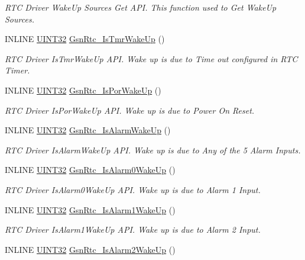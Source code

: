 \begin{DoxyCompactItemize}
\begin{DoxyCompactList}\small\item\em RTC Driver WakeUp Sources Get API. This function used to Get WakeUp Sources. \end{DoxyCompactList}\item 
INLINE \hyperlink{a00660_gae1e6edbbc26d6fbc71a90190d0266018}{UINT32} \hyperlink{a00651_gac5f85e1752f44da34bca2d3166fa9216}{GsnRtc\_\-IsTmrWakeUp} ()
\begin{DoxyCompactList}\small\item\em RTC Driver IsTmrWakeUp API. Wake up is due to Time out configured in RTC Timer. \end{DoxyCompactList}\item 
INLINE \hyperlink{a00660_gae1e6edbbc26d6fbc71a90190d0266018}{UINT32} \hyperlink{a00651_gac8dbdbc4b1c56ab9676f530d5c2a3832}{GsnRtc\_\-IsPorWakeUp} ()
\begin{DoxyCompactList}\small\item\em RTC Driver IsPorWakeUp API. Wake up is due to Power On Reset. \end{DoxyCompactList}\item 
INLINE \hyperlink{a00660_gae1e6edbbc26d6fbc71a90190d0266018}{UINT32} \hyperlink{a00651_gad1ed2ab29251cd12aa6111b17f0e2cd3}{GsnRtc\_\-IsAlarmWakeUp} ()
\begin{DoxyCompactList}\small\item\em RTC Driver IsAlarmWakeUp API. Wake up is due to Any of the 5 Alarm Inputs. \end{DoxyCompactList}\item 
INLINE \hyperlink{a00660_gae1e6edbbc26d6fbc71a90190d0266018}{UINT32} \hyperlink{a00651_ga29ead4066eafd8132311c4930354dda9}{GsnRtc\_\-IsAlarm0WakeUp} ()
\begin{DoxyCompactList}\small\item\em RTC Driver IsAlarm0WakeUp API. Wake up is due to Alarm 1 Input. \end{DoxyCompactList}\item 
INLINE \hyperlink{a00660_gae1e6edbbc26d6fbc71a90190d0266018}{UINT32} \hyperlink{a00651_ga2847e2771d32e17781aa788bd01e514b}{GsnRtc\_\-IsAlarm1WakeUp} ()
\begin{DoxyCompactList}\small\item\em RTC Driver IsAlarm1WakeUp API. Wake up is due to Alarm 2 Input. \end{DoxyCompactList}\item 
INLINE \hyperlink{a00660_gae1e6edbbc26d6fbc71a90190d0266018}{UINT32} \hyperlink{a00651_gacc97418bf621c4596f24bfc475ed51f7}{GsnRtc\_\-IsAlarm2WakeUp} ()

\end{DoxyCompactItemize}

